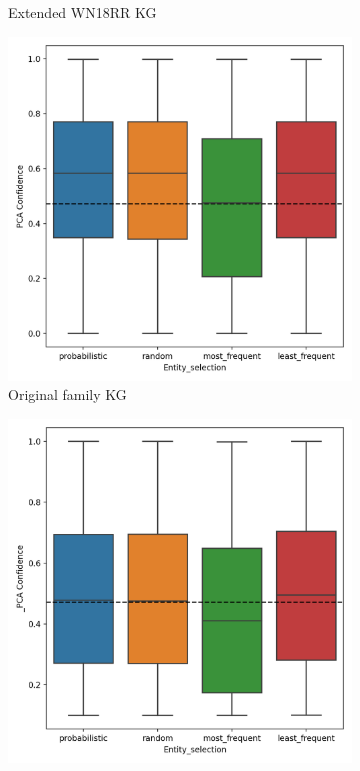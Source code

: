 \begin{figure}[htbp]
\begin{subfigure}{.5\textwidth}
  \caption{Extended WN18RR KG}
  \label{fig:_PCA_entity_wn18rr_boxplot_sub}
\end{subfigure}
\begin{subfigure}{.5\textwidth}
  \centering
  \includegraphics[width=1\linewidth]{figures/results/entity_selection/PCA-entity_family.png}
  \caption{Original family KG}
  \label{fig:models_entity_boxplot_sub}
\end{subfigure}%
\begin{subfigure}{.5\textwidth}
  \centering
  \includegraphics[width=1\linewidth]{figures/results/entity_selection/_PCA-entity_family.png}

\end{subfigure}
\end{figure}
